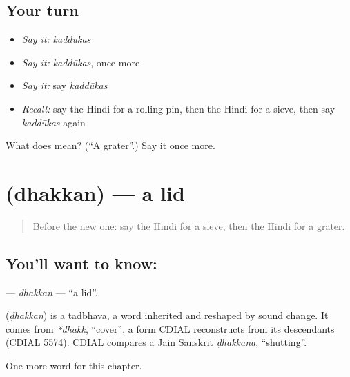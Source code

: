 \subsection*{Your turn}
\begin{itemize}
\raggedright
  \item \emph{Say it:} \emph{kaddūkas}
  \item \emph{Say it:} \emph{kaddūkas}, once more
  \item \emph{Say it:} say \emph{kaddūkas}
  \item \emph{Recall:} say the Hindi for a rolling pin, then the Hindi for a sieve, then say \emph{kaddūkas} again
\end{itemize}

\begin{tcolorbox}[breakable,colback=teal!4,colframe=teal!35!black,title={Before you move on}]
What does  mean? (\textquotedblleft{}A grater\textquotedblright{}.) Say it once more.
\end{tcolorbox}
\section[\texorpdfstring{\hi{ढक्कन} (dhakkan)}{ढक्कन (dhakkan)}]{ (dhakkan) — a lid}

\label{lesson:HI-C270-dhakkan}



\begin{quote}
Before the new one: say the Hindi for a sieve, then the Hindi for a grater.
\end{quote}

\subsection*{You'll want to know: }
\textbf{} — \emph{dhakkan} — \textquotedblleft{}a lid\textquotedblright{}.

\begin{cousinweb}
\textbf{} (\emph{ḍhakkan}) is a tadbhava, a word inherited and reshaped by sound change. It comes from \emph{*ḍhakk}, \textquotedblleft{}cover\textquotedblright{}, a form CDIAL reconstructs from its descendants (CDIAL 5574). CDIAL compares a Jain Sanskrit \emph{ḍhakkana}, \textquotedblleft{}shutting\textquotedblright{}.
\end{cousinweb}

\begin{grammarlens}[title={What you've built}]
One more word for this chapter.
\end{grammarlens}

